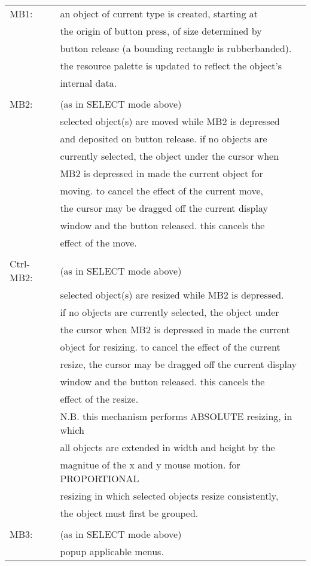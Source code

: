 \begin{tabular}{ll}
MB1: & an object of current type is created, starting at\\
     & the origin of button press, of size determined by\\
     & button release (a bounding rectangle is rubberbanded).\\
     & the resource palette is updated to reflect the object's\\
     & internal data.\\
\\
MB2: & (as in SELECT mode above)\\
     & selected object(s) are moved while MB2 is depressed\\
     & and deposited on button release.  if no objects are\\
     & currently selected, the object under the cursor when\\
     & MB2 is depressed in made the current object for \\
     & moving. to cancel the effect of the current move,\\
     & the cursor may be dragged off the current display\\
     & window and the button released.  this cancels the\\
     & effect of the move.\\
\\
Ctrl-MB2: & (as in SELECT mode above)\\
	  & selected object(s) are resized while MB2 is depressed.\\
	  & if no objects are currently selected, the object under\\
	  & the cursor when MB2 is depressed in made the current\\
	  & object for resizing. to cancel the effect of the current\\
	  & resize, the cursor may be dragged off the current display\\
	  & window and the button released.  this cancels the\\
	  & effect of the resize.\\
	  & N.B. this mechanism performs ABSOLUTE resizing, in which\\
	  & all objects are extended in width and height by the \\
	  & magnitue of the x and y mouse motion.  for PROPORTIONAL\\
	  & resizing in which selected objects resize consistently,\\
	  & the object must first be grouped.\\
\\
MB3: & (as in SELECT mode above)\\
     & popup applicable menus.\\
\end{tabular}\\


